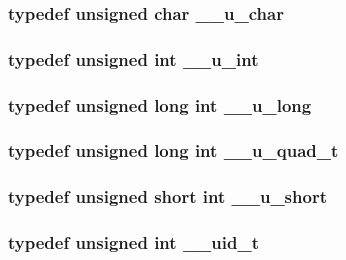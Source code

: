 \subsubsection[{\_\-\_\-u\_\-char}]{\setlength{\rightskip}{0pt plus 5cm}typedef unsigned char {\bf \_\-\_\-u\_\-char}}\label{tp_8c_ac2c764aad0237bd869afe891f76e5c22}
\subsubsection[{\_\-\_\-u\_\-int}]{\setlength{\rightskip}{0pt plus 5cm}typedef unsigned int {\bf \_\-\_\-u\_\-int}}\label{tp_8c_a67868d3d2d9437a6b4479960292097ed}
\subsubsection[{\_\-\_\-u\_\-long}]{\setlength{\rightskip}{0pt plus 5cm}typedef unsigned long int {\bf \_\-\_\-u\_\-long}}\label{tp_8c_a7d79d250616da065d1305dcdb8059bb7}
\subsubsection[{\_\-\_\-u\_\-quad\_\-t}]{\setlength{\rightskip}{0pt plus 5cm}typedef unsigned long int {\bf \_\-\_\-u\_\-quad\_\-t}}\label{tp_8c_a547c0a782920da0394df2687f0410e22}
\subsubsection[{\_\-\_\-u\_\-short}]{\setlength{\rightskip}{0pt plus 5cm}typedef unsigned short int {\bf \_\-\_\-u\_\-short}}\label{tp_8c_ac1f15a6ae74a96d16e9b98552ace949b}
\subsubsection[{\_\-\_\-uid\_\-t}]{\setlength{\rightskip}{0pt plus 5cm}typedef unsigned int {\bf \_\-\_\-uid\_\-t}}\label{tp_8c_a01bf9ef0cf30a7fb03362107fc4403d5}
